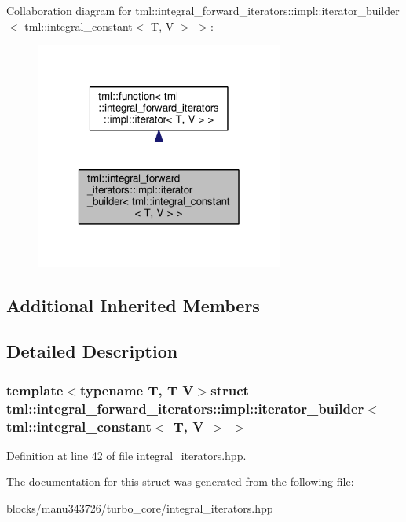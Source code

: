 Collaboration diagram for tml\+:\+:integral\+\_\+forward\+\_\+iterators\+:\+:impl\+:\+:iterator\+\_\+builder$<$ tml\+:\+:integral\+\_\+constant$<$ T, V $>$ $>$\+:
\nopagebreak
\begin{figure}[H]
\begin{center}
\leavevmode
\includegraphics[width=232pt]{structtml_1_1integral__forward__iterators_1_1impl_1_1iterator__builder_3_01tml_1_1integral__cons903ef8043b45b90513529bf92b471f55}
\end{center}
\end{figure}
\subsection*{Additional Inherited Members}


\subsection{Detailed Description}
\subsubsection*{template$<$typename T, T V$>$struct tml\+::integral\+\_\+forward\+\_\+iterators\+::impl\+::iterator\+\_\+builder$<$ tml\+::integral\+\_\+constant$<$ T, V $>$ $>$}



Definition at line 42 of file integral\+\_\+iterators.\+hpp.



The documentation for this struct was generated from the following file\+:\begin{DoxyCompactItemize}
\item 
blocks/manu343726/turbo\+\_\+core/integral\+\_\+iterators.\+hpp\end{DoxyCompactItemize}
